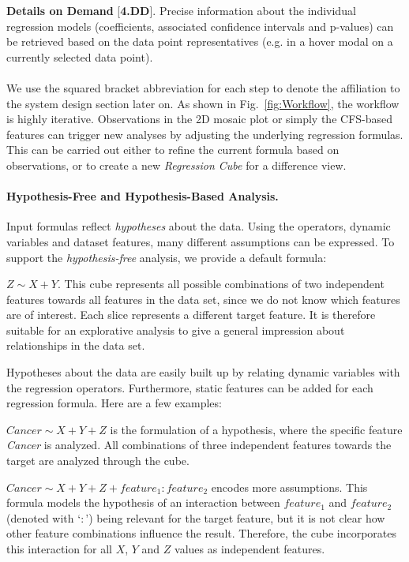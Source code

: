 \documentclass[journal]{style/vgtc} 			          %
\begin{document}
\textbf{Details on Demand} [\textbf{4.DD}]. Precise information about the individual regression models (coefficients, associated confidence intervals and p-values) can be retrieved based on the data point representatives (e.g. in a hover modal on a currently selected data point).
\\\\
We use the squared bracket abbreviation for each step to denote the affiliation to the system design section later on.
As shown in Fig.~\ref{fig:Workflow}, the workflow is highly iterative.
Observations in the 2D mosaic plot or simply the CFS-based features can trigger new analyses by adjusting the underlying regression formulas.
This can be carried out either to refine the current formula based on observations, or to create a new \emph{Regression Cube} for a difference view.
\paragraph{Hypothesis-Free and Hypothesis-Based Analysis.}
Input formulas reflect \emph{hypotheses} about the data.
Using the operators, dynamic variables and dataset features, many different assumptions can be expressed.
To support the \emph{hypothesis-free} analysis, we provide a default formula:

$Z \sim X + Y$.
This cube represents all possible combinations of two independent features towards all features in the data set, since we do not know which features are of interest.
Each slice represents a different target feature.
It is therefore suitable for an explorative analysis to give a general impression about relationships in the data set.

Hypotheses about the data are easily built up by relating dynamic variables with the regression operators.
Furthermore, static features can be added for each regression formula.
Here are a few examples:

$Cancer \sim X + Y + Z$ is the formulation of a hypothesis, where the specific feature \textit{Cancer} is analyzed.
All combinations of three independent features towards the target are analyzed through the cube.

$Cancer \sim X + Y + Z + feature_1:feature_2$ encodes more assumptions.
This formula models the hypothesis of an interaction between $feature_1$ and $feature_2$ (denoted with `$:$') being relevant for the target feature, but it is not clear how other feature combinations influence the result.
Therefore, the cube incorporates this interaction for all $X$, $Y$ and $Z$ values as independent features.
\end{document}

